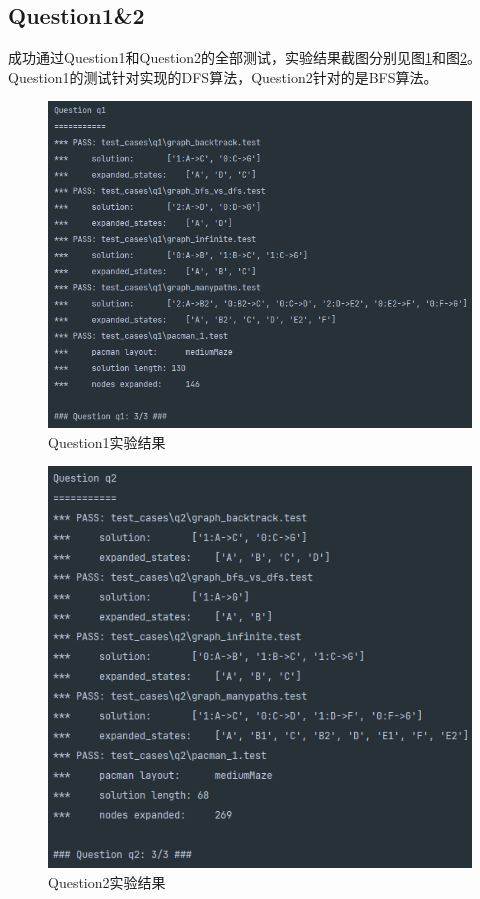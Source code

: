 \subsection{Question1\&2}
成功通过Question1和Question2的全部测试，实验结果截图分别见图\ref{q1}和图\ref{q2}。Question1的测试针对实现的DFS算法，Question2针对的是BFS算法。
\begin{figure}[htbp]
    \centering
    \includegraphics[scale = 0.7]{pic/q1.png}
    \caption{Question1实验结果}\label{q1}
\end{figure}
\begin{figure}[!htbp]
    \centering
    \includegraphics[scale = 0.7]{pic/q2.png}
    \caption{Question2实验结果}\label{q2}
\end{figure}


